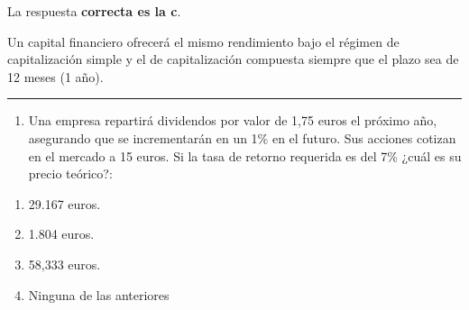\documentclass[
  letterpaper,
  DIV=11,
  numbers=noendperiod]{scrreprt}
\providecommand{\tightlist}{%
  \setlength{\itemsep}{0pt}\setlength{\parskip}{0pt}}\usepackage{longtable,booktabs,array}
\begin{document}
\begin{tcolorbox}[enhanced jigsaw, left=2mm, opacityback=0, colback=white, breakable, arc=.35mm, bottomrule=.15mm, rightrule=.15mm, toprule=.15mm, leftrule=.75mm, colframe=quarto-callout-tip-color-frame]
\begin{minipage}[t]{5.5mm}
\textcolor{quarto-callout-tip-color}{\faLightbulb}
\end{minipage}%
\begin{minipage}[t]{\textwidth - 5.5mm}

La respuesta \textbf{correcta es la c}.

Un capital financiero ofrecerá el mismo rendimiento bajo el régimen de
capitalización simple y el de capitalización compuesta siempre que el
plazo sea de 12 meses (1 año).

\end{minipage}%
\end{tcolorbox}

\begin{center}\rule{0.5\linewidth}{0.5pt}\end{center}

\begin{enumerate}
\def\labelenumi{\arabic{enumi}.}
\setcounter{enumi}{33}
\tightlist
\item
  Una empresa repartirá dividendos por valor de 1,75 euros el próximo
  año, asegurando que se incrementarán en un 1\% en el futuro. Sus
  acciones cotizan en el mercado a 15 euros. Si la tasa de retorno
  requerida es del 7\% ¿cuál es su precio teórico?:
\end{enumerate}

\begin{enumerate}
\def\labelenumi{\alph{enumi})}
\item
  29.167 euros.
\item
  1.804 euros.
\item
  58,333 euros.
\item
  Ninguna de las anteriores
\end{enumerate}
\end{document}

